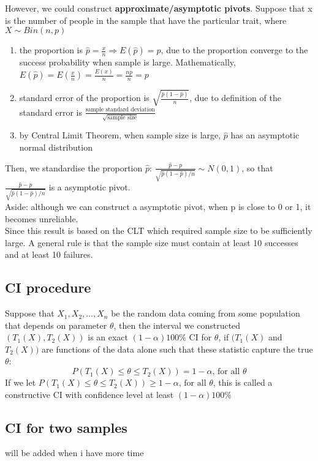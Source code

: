 \documentclass[12pt ]{article}
\begin{document}
However, we could construct \textbf{approximate/asymptotic pivots}. Suppose that x is the number of people in the sample that have the particular trait, where $X \sim Bin(n, p)$
\begin{enumerate}
\item the proportion is $\hat{p} = \frac{x}{n} \Rightarrow E(\hat{p}) = p$, due to the proportion converge to the success probability when sample is large. Mathematically, $E(\hat{p}) = E(\frac{x}{n}) = \frac{E(x)}{n} = \frac{np}{n} = p$
\item standard error of the proportion is  $\sqrt{\frac{\hat{p}(1-\hat{p})}{n}}$, due to definition of the standard error is $\frac{\text{sample standard deviation}}{\sqrt{\text{sample size}}}$
\item by Central Limit Theorem, when sample size is large, $\hat{p}$ has an asymptotic normal distribution
\end{enumerate}
Then, we standardise the proportion $\hat{p}$: $\frac{\hat{p} - p}{\sqrt{\hat{p}(1-\hat{p}) / n}} \sim N(0, 1)$, so that $\frac{\hat{p} - p}{\sqrt{\hat{p}(1-\hat{p}) / n}}$ is a asymptotic pivot.\\
\color{brown}
Aside: although we can construct a asymptotic pivot, when p is close to 0 or 1, it becomes unreliable.\\
\color{black}
Since this result is based on the CLT which required sample size to be sufficiently large. A general rule is that the sample size must contain at least 10 successes and at least 10 failures.

\subsection{CI procedure}
Suppose that $X_{1}, X_{2}, \ldots, X_{n}$ be the random data coming from some population that depends on parameter $\theta$, then the interval we constructed $(T_{1}(X), T_{2}(X))$ is an exact $(1-\alpha) 100 \%$ CI for $\theta$, if $(T_{1}(X)$ and $T_{2}(X))$ are functions of the data alone such that these statistic capture the true $\theta$:
\begin{equation*}
P(T_{1}(X) \leq \theta \leq T_{2}(X)) = 1 - \alpha  \mbox{, for all } \theta
\end{equation*}
If we let $P(T_{1}(X) \leq \theta \leq T_{2}(X)) \geq 1 - \alpha  \mbox{, for all } \theta$, this is called a constructive CI with confidence level at least $(1 - \alpha)100\%$

\subsection{CI for two samples}
will be added when i have more time
\end{document}
